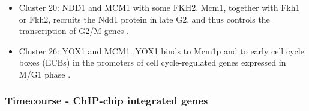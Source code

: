 \documentclass[]{article}
\begin{document}
\begin{itemize}
	\item Cluster 20: NDD1 and MCM1 with some FKH2. Mcm1, together with Fkh1 or Fkh2, recruits the Ndd1 protein in late G2, and thus controls the transcription of G2/M genes \citep{simon2001serial, koranda2000forkhead}. 
	\item Cluster 26: YOX1 and MCM1. YOX1 binds to Mcm1p and to early cell cycle boxes (ECBs) in the promoters of cell cycle-regulated genes expressed in M/G1 phase \citep{pramila2002conserved}. 
\end{itemize}

\subsubsection{Timecourse - ChIP-chip integrated genes}
\end{document}
